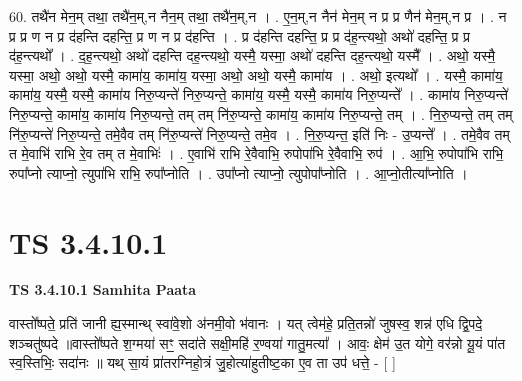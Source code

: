 \documentclass[17pt]{extarticle}
\begin{document}
60. तथै॑न मेन॒म् तथा॒ तथै॑न॒म्,न नैन॒म् तथा॒ तथै॑न॒म्,न । . ए॒न॒म्,न नैन॑ मेन॒म् न प्र प्र णैन॑ मेन॒म्,न प्र । . न प्र प्र ण न प्र द॑हन्ति दहन्ति॒ प्र ण न प्र द॑हन्ति । . प्र द॑हन्ति दहन्ति॒ प्र प्र द॑ह॒न्त्यथो॒ अथो॑ दहन्ति॒ प्र प्र द॑ह॒न्त्यथो᳚ । . द॒ह॒न्त्यथो॒ अथो॑ दहन्ति दह॒न्त्यथो॒ यस्मै॒ यस्मा॒ अथो॑ दहन्ति दह॒न्त्यथो॒ यस्मै᳚ । . अथो॒ यस्मै॒ यस्मा॒ अथो॒ अथो॒ यस्मै॒ कामा॑य॒ कामा॑य॒ यस्मा॒ अथो॒ अथो॒ यस्मै॒ कामा॑य । . अथो॒ इत्यथो᳚ । . यस्मै॒ कामा॑य॒ कामा॑य॒ यस्मै॒ यस्मै॒ कामा॑य निरु॒प्यन्ते॑ निरु॒प्यन्ते॒ कामा॑य॒ यस्मै॒ यस्मै॒ कामा॑य निरु॒प्यन्ते᳚ । . कामा॑य निरु॒प्यन्ते॑ निरु॒प्यन्ते॒ कामा॑य॒ कामा॑य निरु॒प्यन्ते॒ तम् तम् नि॑रु॒प्यन्ते॒ कामा॑य॒ कामा॑य निरु॒प्यन्ते॒ तम् । . नि॒रु॒प्यन्ते॒ तम् तम् नि॑रु॒प्यन्ते॑ निरु॒प्यन्ते॒ तमे॒वैव तम् नि॑रु॒प्यन्ते॑ निरु॒प्यन्ते॒ तमे॒व । . नि॒रु॒प्यन्त॒ इति॑ निः - उ॒प्यन्ते᳚ । . तमे॒वैव तम् त मे॒वाभि॑ राभि रे॒व तम् त मे॒वाभिः॑ । . ए॒वाभि॑ राभि रे॒वैवाभि॒ रुपोपा॑भि रे॒वैवाभि॒ रुप॑ । . आ॒भि॒ रुपोपा॑भि राभि॒ रुपा᳚प्नो त्याप्नो॒ त्युपा॑भि राभि॒ रुपा᳚प्नोति । . उपा᳚प्नो त्याप्नो॒ त्युपोपा᳚प्नोति । . आ॒प्नो॒तीत्या᳚प्नोति । \newline
\pagebreak
{}

\section{ TS 3.4.10.1 }

\textbf{TS 3.4.10.1 } \newline
\textbf{Samhita Paata} \newline

वास्तो᳚ष्पते॒ प्रति॑ जानी ह्य॒स्मान्थ् स्वा॑वे॒शो अ॑नमी॒वो भ॑वानः । यत् त्वेम॑हे॒ प्रति॒तन्नो॑ जुषस्व॒ शन्न॑ एधि द्वि॒पदे॒ शञ्चतु॑ष्पदे ॥वास्तो᳚ष्पते श॒ग्मया॑ सꣳ॒॒ सदा॑ते सक्षी॒महि॑ र॒ण्वया॑ गातु॒मत्या᳚ । आवः॒ क्षेम॑ उ॒त योगे॒ वर॑न्नो यू॒यं पा॑त स्व॒स्तिभिः॒ सदा॑नः ॥ यथ् सा॒यं प्रा॑तरग्निहो॒त्रं जु॒होत्या॑हुतीष्ट॒का ए॒व ता उप॑ धत्ते॒ - [  ] \newline
\end{document}
